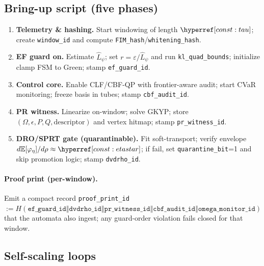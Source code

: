 \subsection{Bring-up script (five phases)}\label{subsec:bringup}
\emph{}

\begin{enumerate}[leftmargin=*]
\item \textbf{Telemetry \& hashing.} Start windowing of length $\constref{tau}$; create \texttt{window\_id} and compute \texttt{FIM\_hash}/\texttt{whitening\_hash}.
\item \textbf{EF guard on.} Estimate $\hat L_\psi$; set $r=\varepsilon/\hat L_\psi$ and run \texttt{kl\_quad\_bounds}; initialize clamp FSM to Green; stamp \texttt{ef\_guard\_id}.
\item \textbf{Control core.} Enable CLF/CBF-QP with frontier-aware audit; start CVaR monitoring; freeze basis in tubes; stamp \texttt{cbf\_audit\_id}.
\item \textbf{PR witness.} Linearize on-window; solve GKYP; store $(\Omega,\epsilon,P,Q,\text{descriptor})$ and vertex hitmap; stamp \texttt{pr\_witness\_id}.
\item \textbf{DRO/SPRT gate (quarantinable).} Fit soft-transport; verify envelope $d\mathbb E[\varphi_\eta]/d\rho\approx \constref{etastar}$; if fail, set \texttt{quarantine\_bit}=1 and skip promotion logic; stamp \texttt{dvdrho\_id}.
\end{enumerate}

\paragraph{Proof print (per-window).}
Emit a compact record \texttt{proof\_print\_id} $:= H(\texttt{ef\_guard\_id}\!\Vert\!\texttt{dvdrho\_id}\!\Vert\!\texttt{pr\_witness\_id}\!\Vert\!\texttt{cbf\_audit\_id}\!\Vert\!\texttt{omega\_monitor\_id})$ that the automata also ingest; any guard-order violation fails closed for that window.

\subsection{Self-scaling loops}\label{subsec:self-scaling}
\emph{}

